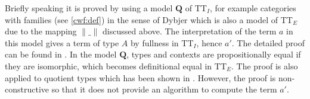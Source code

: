 Briefly speaking it is proved by using a model $\mathbf{Q}$ of TT$_I$, for example categories with families (see \autoref{cwf:def}) in the sense of Dybjer which is also a model of TT$_E$ due to the mapping $\|\_\|$ discussed above. The interpretation of the term $a$ in this model gives a term of type $A$ by fullness in TT$_I$, hence $a'$. The detailed proof can be found in \cite{hof:95:con}. In the model $\mathbf{Q}$, types and contexts are propositionally equal if they are isomorphic, which becomes definitional equal in TT$_E$. The proof is also applied to quotient types which has been shown in \cite{hof:phd}.
However, the proof is non-constructive so that it does not provide an algorithm to compute the term $a'$.


















